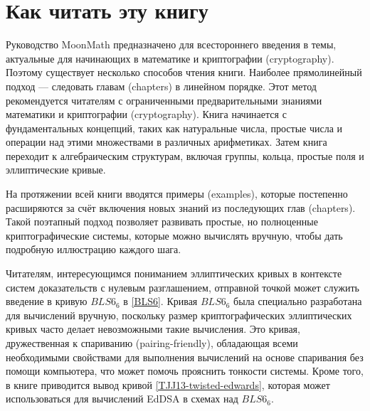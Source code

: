 \section{Как читать эту книгу}
Руководство MoonMath предназначено для всестороннего введения в темы, актуальные для начинающих в математике и криптографии (cryptography). Поэтому существует несколько способов чтения книги. Наиболее прямолинейный подход — следовать главам (chapters) в линейном порядке. Этот метод рекомендуется читателям с ограниченными предварительными знаниями математики и криптографии (cryptography). Книга начинается с фундаментальных концепций, таких как натуральные числа, простые числа и операции над этими множествами в различных арифметиках. Затем книга переходит к алгебраическим структурам, включая группы, кольца, простые поля и эллиптические кривые.

На протяжении всей книги вводятся примеры (examples), которые постепенно расширяются за счёт включения новых знаний из последующих глав (chapters). Такой поэтапный подход позволяет развивать простые, но полноценные криптографические системы, которые можно вычислять вручную, чтобы дать подробную иллюстрацию каждого шага.

Читателям, интересующимся пониманием эллиптических кривых в контексте систем доказательств с нулевым разглашением, отправной точкой может служить введение в кривую $BLS6_6$ в \secname{} \ref{BLS6}. Кривая $BLS6_6$ была специально разработана для вычислений вручную, поскольку размер криптографических эллиптических кривых часто делает невозможными такие вычисления. Это кривая, дружественная к спариванию (pairing-friendly), обладающая всеми необходимыми свойствами для выполнения вычислений на основе спаривания без помощи компьютера, что может помочь прояснить тонкости системы. Кроме того, в книге приводится вывод кривой  \ref{TJJ13-twisted-edwards}, которая может использоваться для вычислений EdDSA в схемах над $BLS6_6$.

